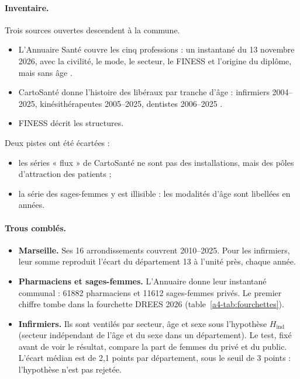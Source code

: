 \paragraph{Inventaire.} Trois sources ouvertes descendent à la commune.
\begin{itemize}
  \item L'Annuaire Santé couvre les cinq professions : un instantané du 13 novembre 2026, avec la civilité, le mode,
  le secteur, le FINESS et l'origine du diplôme, mais sans âge \citep{a4-ans2026annuaire}.
  \item CartoSanté donne l'histoire des libéraux par tranche d'âge : infirmiers 2004--2025, kinésithérapeutes
  2005--2025, dentistes 2006--2025 \citep{a4-cartosante2026}.
  \item FINESS décrit les structures.
\end{itemize}
Deux pistes ont été écartées :
\begin{itemize}
  \item les séries « flux » de CartoSanté ne sont pas des installations, mais des pôles d'attraction des patients ;
  \item la série des sages-femmes y est illisible : les modalités d'âge sont libellées en années.
\end{itemize}

\paragraph{Trous comblés.}
\begin{itemize}
  \item \textbf{Marseille.} Ses 16 arrondissements couvrent 2010--2025. Pour les infirmiers, leur somme reproduit
  l'écart du département 13 à l'unité près, chaque année\mesure{}.
  \item \textbf{Pharmaciens et sages-femmes.} L'Annuaire donne leur instantané communal : \num{61882}
  pharmaciens et \num{11612} sages-femmes privés\mesure{}. Le premier chiffre tombe dans la fourchette DREES
  2026 (table~\ref{a4-tab:fourchettes}).
  \item \textbf{Infirmiers.} Ils sont ventilés par secteur, âge et sexe sous l'hypothèse $H_{\mathrm{ind}}$
  (secteur indépendant de l'âge et du sexe dans un département). Le test, fixé avant de voir le résultat,
  compare la part de femmes du privé et du public. L'écart médian est de 2,1 points par département, sous le
  seuil de 3 points : l'hypothèse n'est pas rejetée\mesure{}.
\end{itemize}

